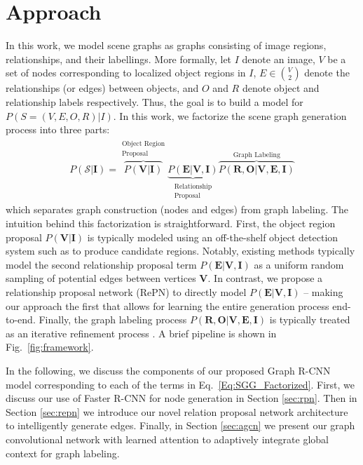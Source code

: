 \section{Approach}
In this work, we model scene graphs as graphs consisting of image regions, relationships, and their labellings. More formally, 
let $I$ denote an image, $V$ be a set of nodes corresponding to localized object regions in $I$, $E \in {V \choose 2}$ denote the relationships (or edges) between objects, and $O$ and $R$ denote object and relationship labels respectively. Thus, the goal is to build a model for $P(S = (V, E, O, R) | I)$. In this work, we factorize the scene graph generation process into three parts:
\begin{eqnarray}
P(\mathcal{S}|\bm{I}) = \overbrace{P(\bm{V}|\bm{I})}^{\substack{\text{Object Region}\\ \text{Proposal}}}\underbrace{P(\bm{E}|\bm{V},\bm{I})}_{\substack{\text{Relationship} \\ \text{Proposal}}} \overbrace{P(\bm{R},\bm{O}|\bm{V}, \bm{E}, \bm{I})}^{\text{Graph Labeling}}
\label{Eq:SGG_Factorized}
\end{eqnarray}
which separates graph construction (nodes and edges) from graph labeling. The intuition behind this factorization is straightforward. First, the object region proposal $P(\bm{V}|\bm{I})$ is typically modeled using an off-the-shelf object detection system such as \cite{ren2015faster} to produce candidate regions. Notably, existing methods typically model the second relationship proposal term $P(\bm{E}|\bm{V},\bm{I})$ as a uniform random sampling of potential edges between vertices $\bm{V}$. In contrast, we propose a relationship proposal network (RePN) to directly model $P(\bm{E}|\bm{V},\bm{I})$ -- making our approach the first that allows for learning the entire generation process end-to-end. Finally, the graph labeling process $P(\bm{R},\bm{O}|\bm{V}, \bm{E}, \bm{I})$ is typically treated as an iterative refinement process \cite{li2017vip,xu2017scene,dai2017detecting}. A brief pipeline is shown in Fig.~\ref{fig:framework}.

In the following, we discuss the components of our proposed Graph R-CNN model corresponding to each of the terms in Eq.~\ref{Eq:SGG_Factorized}. First, we discuss our use of Faster R-CNN \cite{ren2015faster} for node generation in Section \ref{sec:rpn}. Then in Section \ref{sec:repn} we introduce our novel relation proposal network architecture to intelligently generate edges. Finally, in Section \ref{sec:agcn} we present our graph convolutional network \cite{kipf2016semi} with learned attention to adaptively integrate global context for graph labeling.

